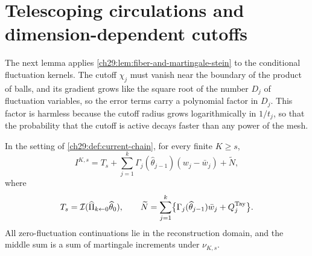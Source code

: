 \section{Telescoping circulations and dimension-dependent cutoffs}\label{ch29:sec:cutoff}

The next lemma applies \cref{ch29:lem:fiber-and-martingale-stein} to the conditional fluctuation kernels. The cutoff $\chi_j$ must vanish near the boundary of the product of balls, and its gradient grows like the square root of the number $D_j$ of fluctuation variables, so the error terms carry a polynomial factor in $D_j$. This factor is harmless because the cutoff radius grows logarithmically in $1/t_j$, so that the probability that the cutoff is active decays faster than any power of the mesh.

\begin{lemma}\label{ch29:lem:current-telescope-and-cutoff}
In the setting of \cref{ch29:def:current-chain}, for every finite $K\ge s$,
\[
 I^{K,s}=T_s+\sum_{j=1}^k\Gamma_j(\widehat\theta_{j-1})(w_j-\bar w_j)+\widetilde N,
\]
where
\[
 T_s=\mathcal I(\widehat\Pi_{k\leftarrow0}\widehat\theta_0),\qquad \widetilde N=\sum_{j=1}^k\bigl\{\Gamma_j(\widehat\theta_{j-1})\bar w_j+Q_j^{\rm Tay}\bigr\}.
\]
All zero-fluctuation continuations lie in the reconstruction domain, and the middle sum is a sum of martingale increments under $\nu_{K,s}$.


\end{lemma}

